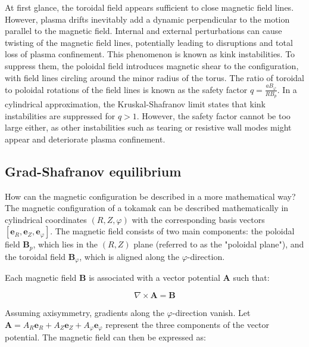 At first glance, the toroidal field appears sufficient to close magnetic field lines. However, plasma drifts inevitably add a dynamic perpendicular to the motion parallel to the magnetic field. Internal and external perturbations can cause twisting of the magnetic field lines, potentially leading to disruptions and total loss of plasma confinement. This phenomenon is known as kink instabilities. To suppress them, the poloidal field introduces magnetic shear to the configuration, with field lines circling around the minor radius of the torus. The ratio of toroidal to poloidal rotations of the field lines is known as the safety factor \( q = \frac{aB_\varphi}{RB_p} \). In a cylindrical approximation, the Kruskal-Shafranov limit \cite{shafranov1956stability, kruskal1958instability} states that kink instabilities are suppressed for \( q > 1 \). However, the safety factor cannot be too large either, as other instabilities such as tearing \cite{furth1973tearing} or resistive wall \cite{fitzpatrick2002simple} modes might appear and deteriorate plasma confinement. \\



\subsection{Grad-Shafranov equilibrium}
\label{sec:intro_GradShafranov}

How can the magnetic configuration be described in a more mathematical way? The magnetic configuration of a tokamak can be described mathematically in cylindrical coordinates \( (R,Z,\varphi) \) with the corresponding basis vectors \([\mathbf{e}_R,\mathbf{e}_Z,\mathbf{e}_\varphi]\). The magnetic field consists of two main components: the poloidal field \(\mathbf{B}_p\), which lies in the \((R,Z)\) plane (referred to as the "poloidal plane"), and the toroidal field \(\mathbf{B}_\varphi\), which is aligned along the \(\varphi\)-direction.

Each magnetic field \(\mathbf{B}\) is associated with a vector potential \(\mathbf{A}\) such that:

\begin{equation}
	\label{eq:intro_magneticVectorPotential}
	\nabla \times \mathbf{A} = \mathbf{B}
\end{equation}

Assuming axisymmetry, gradients along the \(\varphi\)-direction vanish. Let \(\mathbf{A} = A_R \mathbf{e}_R + A_Z \mathbf{e}_Z + A_\varphi \mathbf{e}_\varphi\) represent the three components of the vector potential. The magnetic field can then be expressed as:

